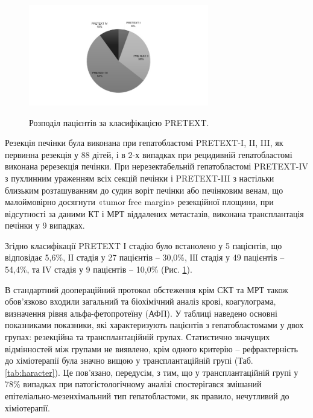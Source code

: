 \begin{figure}[h]
\centering
\includegraphics[width=0.7\textwidth]{Illustrations/pretexpac.jpeg}
\label{fig:pretexpac} %
\caption{Розподіл пацієнтів за класифікацією PRETEXT.}
\end{figure}


Резекція печінки була виконана при гепатобластомі PRETEXT-I, II, III, як первинна резекція у 88 дітей, і в 2-х випадках при рецидивній гепатобластомі виконана ререзекція печінки. При нерезектабельній гепатобластомі PRETEXT-IV з пухлинним ураженням всіх секцій печінки і PRETEXT-III з настільки близьким розташуванням до судин воріт печінки або печінковим венам, що малоймовірно досягнути «tumor free margin» резекційної площини, при відсутності за даними КТ і МРТ віддалених метастазів, виконана трансплантація печінки у 9 випадках.

Згідно класифікації PRETEXT І стадію було встанолено у 5 пацієнтів, що відповідає 5,6\%, ІІ стадія у 27 пацієнтів – 30,0\%, ІІІ стадія у 49 пацієнтів – 54,4\%, та ІV стадія у 9 пацієнтів – 10,0\% (Рис. \ref{fig:pretexpac}).

В стандартний доопераційний протокол обстеження крім СКТ та МРТ також обов’язково входили загальний та біохімічний аналіз крові, коагулограма, визначення рівня альфа-фетопротеїну (АФП). У таблиці наведено основні показниками показники, які характеризують пацієнтів  з гепатобластомами у двох групах: резекційна та трансплантаційній групах. Статистично значущих відмінностей між групами не виявлено, крім одного критерію – рефрактерність до хіміотерапії була значно вищою у трансплантаційній групі (Таб. \ref{tab:haracter}). Це пов’язано, передусім, з тим, що у трансплантаційній групі у 78\% випадках при патогістологічному аналізі спостерігався змішаний епітеліально-мезенхімальний тип гепатобластоми, як правило, нечутливий до хіміотерапії. 

